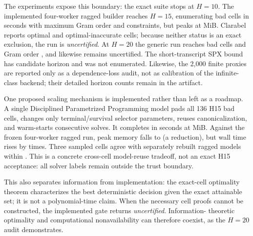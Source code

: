 \documentclass[smallextended]{svjour3}
\begin{document}
The experiments expose this boundary: the exact suite stops at $H=10$.  The
implemented four-worker ragged builder reaches $H=15$, enumerating
\HfifteenCells{} bad cells in \HfifteenWallSeconds{} seconds with maximum Gram
order \HfifteenMaxGram{} and \HfifteenMaxConstraints{} constraints, but peaks
at \HfifteenPeakRss{} MiB.  Clarabel reports \HfifteenOptimal{} optimal and
\HfifteenInaccurate{} optimal-inaccurate cells; because neither status is an
exact exclusion, the run is \emph{uncertified}.  At $H=20$ the generic run
reaches \GenericPepBadCells{} bad cells and Gram order \GenericPepMaxGram{},
and likewise remains uncertified.  The short-transcript SPX bound
has candidate horizon \PositiveSpxShortHybridUpper{} and was not enumerated.
Likewise, the 2,000 finite proxies are reported only as a dependence-loss audit,
not as calibration of the infinite-class backend; their detailed horizon counts
remain in the artifact.

One proposed scaling mechanism is implemented rather than left as a roadmap.
A single Disciplined Parametrized Programming model pads all 136 H15 bad cells,
changes only terminal/survival selector parameters, reuses canonicalization,
and warm-starts consecutive solves.  It completes in
\BatchedHfifteenWallSeconds{} seconds at \BatchedHfifteenPeakRss{} MiB.  Against
the frozen four-worker ragged run, peak memory falls to
\BatchedHfifteenRssRatio{} (a \BatchedHfifteenMemoryReduction{} reduction),
but wall time rises by \BatchedHfifteenWallRatio{} times.  Three sampled cells
agree with separately rebuilt ragged models within
\BatchedHfifteenMaxDifference{}.  This is a concrete cross-cell model-reuse
tradeoff, not an exact H15 acceptance: all solver labels remain outside the
trust boundary.

This also separates information from implementation: the exact-cell optimality
theorem characterizes the best deterministic decision given the exact
attainable set;
it is not a polynomial-time claim.  When the necessary cell proofs cannot be
constructed, the implemented gate returns \emph{uncertified}.  Information-
theoretic optimality and computational nonavailability can therefore coexist,
as the $H=20$ audit demonstrates.
\end{document}
